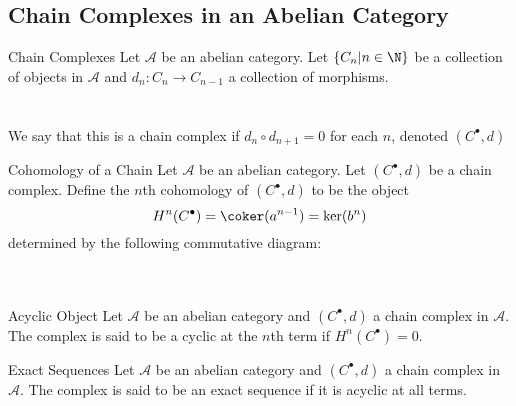 \documentclass[a4paper]{article}
\begin{document}
\subsection{Chain Complexes in an Abelian Category}
\begin{defn}{Chain Complexes}{} Let $\mathcal{A}$ be an abelian category. Let $\{C_n|n\in\N\}$ be a collection of objects in $\mathcal{A}$ and $d_n:C_n\to C_{n-1}$ a collection of morphisms. \\
\\~\\
We say that this is a chain complex if $d_n\circ d_{n+1}=0$ for each $n$, denoted $(C^\bullet,d)$
\end{defn}

\begin{defn}{Cohomology of a Chain}{} Let $\mathcal{A}$ be an abelian category. Let $(C^\bullet,d)$ be a chain complex. Define the $n$th cohomology of $(C^\bullet,d)$ to be the object $$H^n(C^\bullet)=\coker(a^{n-1})=\ker(b^n)$$ determined by the following commutative diagram: \\
\\~\\
\end{defn}

\begin{defn}{Acyclic Object}{} Let $\mathcal{A}$ be an abelian category and $(C^\bullet,d)$ a chain complex in $\mathcal{A}$. The complex is said to be a cyclic at the $n$th term if $H^n(C^\bullet)=0$. 
\end{defn}

\begin{defn}{Exact Sequences}{} Let $\mathcal{A}$ be an abelian category and $(C^\bullet,d)$ a chain complex in $\mathcal{A}$. The complex is said to be an exact sequence if it is acyclic at all terms. 
\end{defn}
\end{document}
